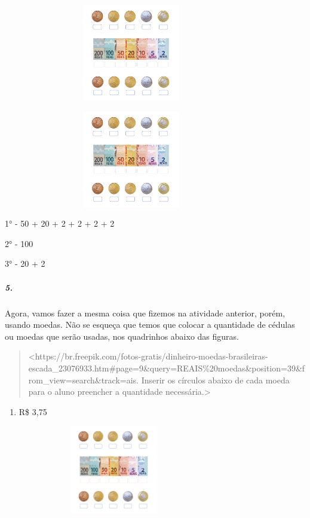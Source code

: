 \includegraphics[width=4.40625in,height=1.66152in]{media/image72.png}

\includegraphics[width=4.40625in,height=1.66152in]{media/image72.png}

1° - 50 + 20 + 2 + 2 + 2 + 2

2° - 100

3° - 20 + 2

\subparagraph{5.}\label{section-61}

Agora, vamos fazer a mesma coisa que fizemos na atividade anterior,
porém, usando moedas. Não se esqueça que temos que colocar a quantidade
de cédulas ou moedas que serão usadas, nos quadrinhos abaixo das
figuras.

\begin{quote}
\textless{}https://br.freepik.com/fotos-gratis/dinheiro-moedas-brasileiras-escada\_23076933.htm\#page=9\&query=REAIS\%20moedas\&position=39\&from\_view=search\&track=ais.
Inserir os círculos abaixo de cada moeda para o aluno preencher a
quantidade necessária.\textgreater{}
\end{quote}

\begin{enumerate}
\def\labelenumi{\alph{enumi})}
\item
  R\$ 3,75
\end{enumerate}

\includegraphics[width=3.80208in,height=1.51291in]{media/image73.png}

